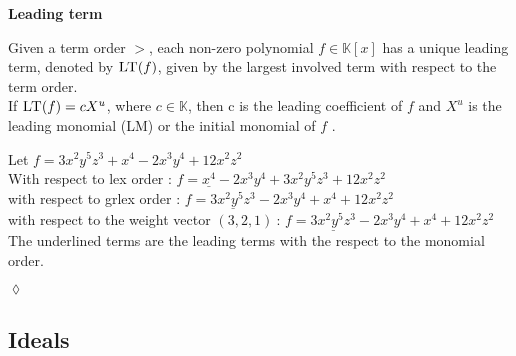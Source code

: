 \textbf{Leading term}

Given a term order $>$, each non-zero polynomial $f \in \mathbb{K}\left[ x\right] $ has a unique leading term, denoted by $\textsc{LT}(f)$, given by the largest involved term with respect to the term order.\\
If $\textsc{LT}(f) = cX^{u}$, where $c \in \mathbb{K}$, then c is the leading coefficient of $f$ and $X^{u}$ is the leading monomial (\textsc{LM}) or the initial monomial of $f$ \cite{KHZ}.\\

\begin{env_example}\normalfont

Let $ f = 3x^{2}y^{5}z^{3} + x^{4} -2x^{3}y^{4} + 12x^{2}z^{2}$ \\
With respect to lex order : $f = \underline{x^{4}} -2x^{3}y^{4} + 3x^{2}y^{5}z^{3} + 12x^{2}z^{2} $ \\
with respect to grlex order : $f = \underline{3x^{2}y^{5}z^{3}} -2x^{3}y^{4} + x^{4}+ 12x^{2}z^{2}$  \\
with respect to the weight vector $\left(3,2,1\right)~$: $f = \underline{3x^{2}y^{5}z^{3}} -2x^{3}y^{4} + x^{4}+ 12x^{2}z^{2}$  \\ 
The underlined terms are the leading terms with the respect to the monomial order.
\begin{flushright}
$\lozenge$
\end{flushright} 
\end{env_example}


\newpage
\subsection{Ideals}
\label{subsec:Ideals}

